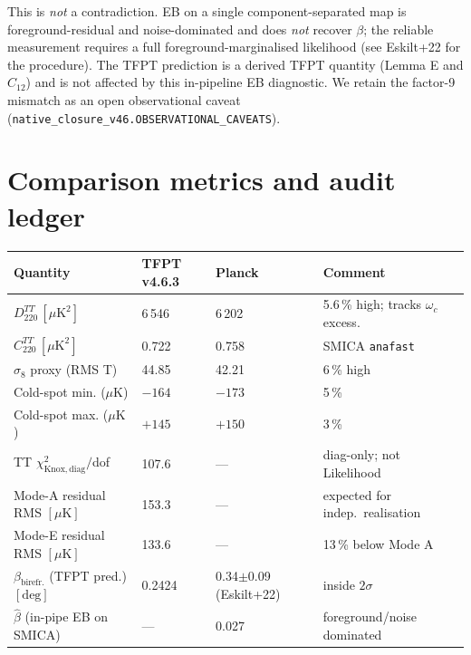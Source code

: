 \documentclass[11pt,a4paper]{article}
\begin{document}
This is \emph{not} a contradiction.  EB on a single component-separated
map is foreground-residual and noise-dominated and does \emph{not}
recover \(\beta\); the reliable measurement requires a full
foreground-marginalised likelihood (see Eskilt+22 for the procedure).
The TFPT prediction is a derived TFPT quantity (Lemma E and
\(C_{12}\)) and is not affected by this in-pipeline EB diagnostic.
We retain the factor-9 mismatch as an open observational caveat
(\texttt{native\_closure\_v46.OBSERVATIONAL\_CAVEATS}).

\section{Comparison metrics and audit ledger}
\label{sec:metrics}

\begin{center}
\renewcommand{\arraystretch}{1.18}
\begin{tabularx}{\textwidth}{@{}p{}p{}p{}Y@{}}
\toprule
\textbf{Quantity} & \textbf{TFPT v4.6.3} & \textbf{Planck} & \textbf{Comment} \\
\midrule
\(D_{220}^{TT}\,[\mu\mathrm{K}^2]\) & 6\,546 & 6\,202 & 5.6\,\% high; tracks \(\omega_c\) excess. \\
\(C_{220}^{TT}\,[\mu\mathrm{K}^2]\)  & 0.722 & 0.758 & SMICA \texttt{anafast} \\
\(\sigma_8\) proxy (RMS T) & 44.85 & 42.21 & 6\,\% high \\
Cold-spot min. (\(\mu\mathrm{K}\))& \(-164\) & \(-173\) & 5\,\% \\
Cold-spot max. (\(\mu\mathrm{K}\))& \(+145\) & \(+150\) & 3\,\% \\
TT \(\chi^2_{\mathrm{Knox,diag}}/\)dof & 107.6 & --- & diag-only; not Likelihood \\
Mode-A residual RMS \([\mu\mathrm{K}]\) & 153.3 & --- & expected for indep.\ realisation \\
Mode-E residual RMS \([\mu\mathrm{K}]\) & 133.6 & --- & 13\,\% below Mode A \\
\(\beta_{\mathrm{birefr.}}\) (TFPT pred.)\,\([\mathrm{deg}]\) & 0.2424 & 0.34\(\pm\)0.09 (Eskilt+22) & inside \(2\sigma\) \\
\(\hat\beta\) (in-pipe EB on SMICA) & --- & 0.027 & foreground/noise dominated \\
\bottomrule
\end{tabularx}
\end{center}
\end{document}
